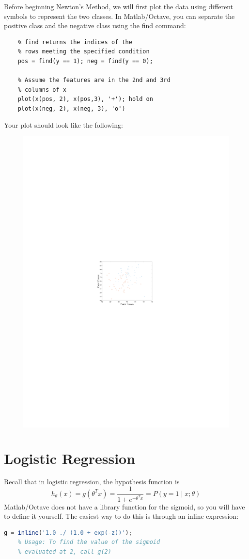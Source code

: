 \documentclass[10pt,a4paper]{article}
\begin{document}
  Before beginning Newton's Method, we will first plot the data using different symbols to represent the two classes. In Matlab/Octave, you can separate the positive class and the negative class using the find command:
  \begin{lstlisting}
    % find returns the indices of the
    % rows meeting the specified condition
    pos = find(y == 1); neg = find(y == 0);

    % Assume the features are in the 2nd and 3rd
    % columns of x
    plot(x(pos, 2), x(pos,3), '+'); hold on
    plot(x(neg, 2), x(neg, 3), 'o')
  \end{lstlisting}
  Your plot should look like the following:
  \begin{figure}[htb!]
    \centering
      \includegraphics[width=.7\columnwidth]{datasamples}
  \end{figure}





\section{Logistic Regression}
%
  Recall that in logistic regression, the hypothesis function is 
  \begin{equation}
    h_\theta(x) = g(\theta^T x) = \frac{1}{1+e^{-\theta^T x}} = P(y=1 \mid x; \theta) 
  \end{equation}
  Matlab/Octave does not have a library function for the sigmoid, so you will have to define it yourself. The easiest way to do this is through an inline expression:
  \begin{lstlisting}[language=Octave, basicstyle=\footnotesize, showspaces=false]
    g = inline('1.0 ./ (1.0 + exp(-z))'); 
    % Usage: To find the value of the sigmoid 
    % evaluated at 2, call g(2)
  \end{lstlisting}
\end{document}
